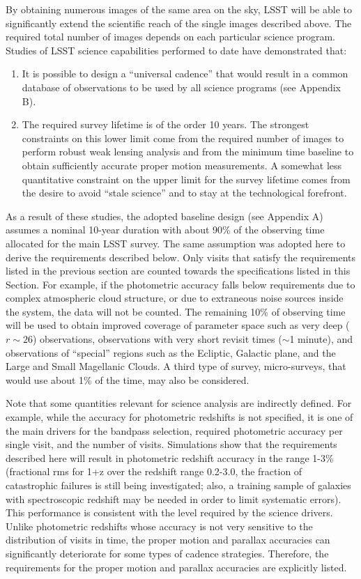 By obtaining numerous images of the same area on the sky, LSST will be able
to significantly extend the scientific reach of the single images described
above.  The required total number of images depends on each particular science
program.  Studies of LSST science capabilities performed to date have
demonstrated that:
\begin{enumerate}
\item It is possible to design a ``universal cadence'' that would result in
a common database of observations to be used by all science programs (see
Appendix B).
\item The required survey lifetime is of the order 10 years. The strongest
constraints on this lower limit come from the required number of images to
perform robust weak lensing analysis and from the minimum time baseline to
obtain sufficiently accurate proper motion measurements. A somewhat less
quantitative constraint on the upper limit for the survey lifetime comes
from the desire to avoid ``stale science'' and to stay at the
technological forefront.
\end{enumerate}

As a result of these studies, the adopted baseline design (see Appendix A)
assumes a nominal 10-year duration with about 90\% of the observing
time allocated for the main LSST survey. The same assumption
was adopted here to derive the requirements described below.  Only visits
that satisfy the requirements listed in the previous section are counted
towards the specifications listed in this Section. For example, if the photometric
accuracy falls below requirements due to complex atmospheric cloud structure,
or due to extraneous noise sources inside the system, the data will not be counted.
The remaining 10\% of observing time will be used to obtain improved coverage
of parameter space such as very deep ($r\sim26$) observations, observations with
very short revisit times ($\sim$1 minute), and observations of  ``special'' regions
such as the Ecliptic, Galactic plane, and the Large and Small Magellanic Clouds.
A third type of survey, micro-surveys, that would use about 1\% of the time,
may also be considered.


Note that some quantities relevant for science analysis are indirectly
defined. For example, while the accuracy for photometric redshifts is not
specified, it is one of the main drivers for the bandpass selection, required photometric
accuracy per single visit, and the number of visits. Simulations show that
the requirements described here will result in photometric redshift
accuracy in the range 1-3\% (fractional rms for 1+z over the redshift range
0.2-3.0, the fraction of catastrophic failures is still being investigated;
also, a training sample of galaxies with spectroscopic redshift may be
needed in order to limit systematic errors). This performance is consistent
with the level required by the science drivers.
Unlike photometric redshifts whose accuracy is not very sensitive to
the distribution of visits in time,  the proper motion and parallax accuracies
can significantly deteriorate for some types of cadence strategies. Therefore,
the requirements for the proper motion and parallax accuracies  are explicitly
listed.



